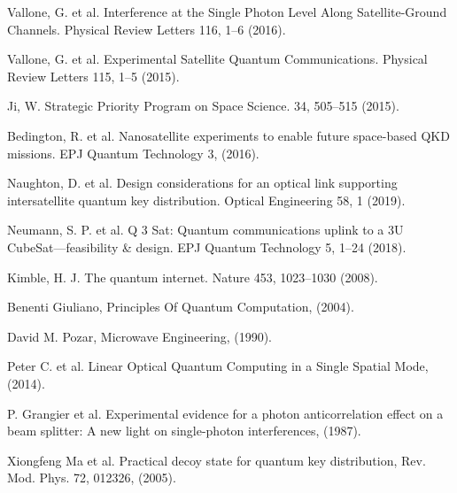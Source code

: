 \begin{thebibliography}{99}
  Vallone,
  G. et al. Interference at the Single Photon Level Along Satellite-Ground Channels. Physical Review Letters 116,
  1–6 (2016).

  Vallone,
  G. et al. Experimental Satellite Quantum Communications. Physical Review Letters 115,
  1–5 (2015).

  Ji,
  W. Strategic Priority Program on Space Science. 34,
  505–515 (2015).

  Bedington,
  R. et al. Nanosatellite experiments to enable future space-based QKD missions. EPJ Quantum Technology 3,
  (2016).

  Naughton,
  D. et al. Design considerations for an optical link supporting intersatellite quantum key distribution. Optical Engineering 58,
  1 (2019).

  Neumann,
  S. P. et al. Q 3 Sat: Quantum communications uplink to a 3U CubeSat—feasibility \& design. EPJ Quantum Technology 5,
  1–24 (2018).

  Kimble,
  H. J. The quantum internet. Nature 453,
  1023–1030 (2008).

  Benenti Giuliano,
  Principles Of Quantum Computation,
  (2004).

  David M. Pozar,
  Microwave Engineering,
  (1990).

  Peter C. et al.
  Linear Optical Quantum Computing in a Single Spatial Mode,
  (2014).

  P. Grangier et al.
  Experimental evidence for a photon anticorrelation effect on a beam splitter: A new light on single-photon interferences,
  (1987).

  Xiongfeng Ma et al.
  Practical decoy state for quantum key distribution,
  Rev. Mod. Phys. 72, 012326,
  (2005).

\end{thebibliography}
